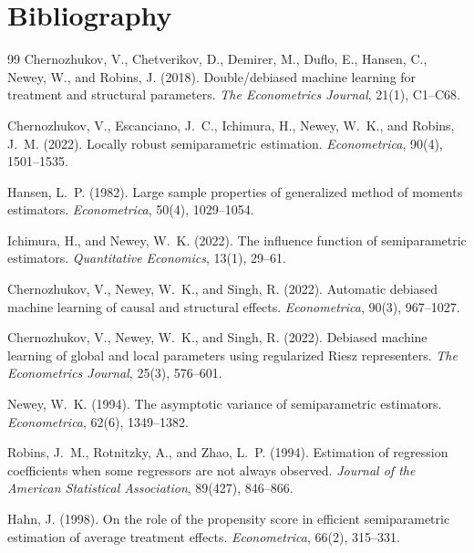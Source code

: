 \documentclass[11pt]{article}
\theoremstyle{definition}
\theoremstyle{plain}
\theoremstyle{remark}
\begin{document}
\section*{Bibliography}
\begin{thebibliography}{99}
Chernozhukov, V., Chetverikov, D., Demirer, M., Duflo, E., Hansen, C., Newey, W., and Robins, J. (2018).
\newblock Double/debiased machine learning for treatment and structural parameters.
\newblock \emph{The Econometrics Journal}, 21(1), C1--C68.

Chernozhukov, V., Escanciano, J.~C., Ichimura, H., Newey, W.~K., and Robins, J.~M. (2022).
\newblock Locally robust semiparametric estimation.
\newblock \emph{Econometrica}, 90(4), 1501--1535.

Hansen, L.~P. (1982).
\newblock Large sample properties of generalized method of moments estimators.
\newblock \emph{Econometrica}, 50(4), 1029--1054.

Ichimura, H., and Newey, W.~K. (2022).
\newblock The influence function of semiparametric estimators.
\newblock \emph{Quantitative Economics}, 13(1), 29--61.

Chernozhukov, V., Newey, W.~K., and Singh, R. (2022).
\newblock Automatic debiased machine learning of causal and structural effects.
\newblock \emph{Econometrica}, 90(3), 967--1027.

Chernozhukov, V., Newey, W.~K., and Singh, R. (2022).
\newblock Debiased machine learning of global and local parameters using regularized Riesz representers.
\newblock \emph{The Econometrics Journal}, 25(3), 576--601.

Newey, W.~K. (1994).
\newblock The asymptotic variance of semiparametric estimators.
\newblock \emph{Econometrica}, 62(6), 1349--1382.

Robins, J.~M., Rotnitzky, A., and Zhao, L.~P. (1994).
\newblock Estimation of regression coefficients when some regressors are not always observed.
\newblock \emph{Journal of the American Statistical Association}, 89(427), 846--866.

Hahn, J. (1998).
\newblock On the role of the propensity score in efficient semiparametric estimation of average treatment effects.
\newblock \emph{Econometrica}, 66(2), 315--331.


\end{thebibliography}
\end{document}
